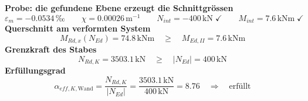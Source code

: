 \documentclass[11pt,a4paper]{article}
\begin{document}
\noindent\textbf{Probe: die gefundene Ebene erzeugt die Schnittgrössen}
\begin{equation*}
\varepsilon_m = -0.0534\,\text{‰} \qquad \chi = 0.00026\,\mathrm{m}^{-1} \qquad N_{int} = -400\,\mathrm{kN} \;\checkmark \qquad M_{int} = 7.6\,\mathrm{kNm} \;\checkmark
\end{equation*}
\noindent\textbf{Querschnitt am verformten System}
\begin{equation*}
M_{Rd,x}(N_{Ed}) = 74.8\,\mathrm{kNm} \quad \ge \quad M_{Ed,II} = 7.6\,\mathrm{kNm}
\end{equation*}
\noindent\textbf{Grenzkraft des Stabes}
\begin{equation*}
N_{Rd,K} = 3503.1\,\mathrm{kN} \quad \ge \quad \left|N_{Ed}\right| = 400\,\mathrm{kN}
\end{equation*}
\noindent\textbf{Erfüllungsgrad}
\begin{equation*}
\alpha_{eff,K,\text{Wand}} = \frac{N_{Rd,K}}{\left|N_{Ed}\right|} = \frac{3503.1\,\mathrm{kN}}{400\,\mathrm{kN}} = 8.76 \quad \Rightarrow \quad \text{erfüllt}
\end{equation*}
\end{document}
